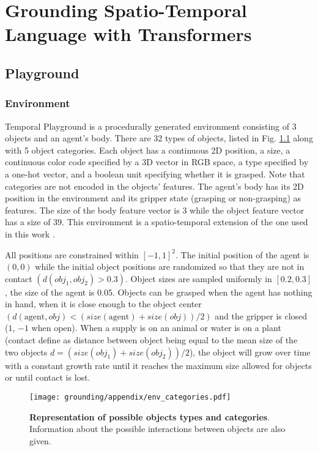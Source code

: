 
\chapter{Grounding Spatio-Temporal Language with Transformers}

\section{Playground}
\subsection{Environment} \label{sup:env}
Temporal Playground is a procedurally generated environment consisting of 3 objects and an agent's body. There are 32 types of objects, listed in Fig. \ref{fig:env-categories} along with 5 object categories. Each object has a continuous 2D position, a size, a continuous color code specified by a 3D vector in RGB space, a type specified by a one-hot vector, and a boolean unit specifying whether it is grasped. Note that categories are not encoded in the objects' features. The agent's body has its 2D position in the environment and its gripper state (grasping or non-grasping) as features. The size of the body feature vector is 3 while the object feature vector has a size of $39$. This environment is a spatio-temporal extension of the one used in this work \cite{imagine}.


All positions are constrained within $[-1,1]^2$. The initial position of the agent is $(0,0)$ while the initial object positions are randomized so that they are not in contact $(d(obj_1,obj_2)>0.3)$. Object sizes are sampled uniformly in $[0.2, 0.3]$, the size of the agent is $0.05$. Objects can be grasped when the agent has nothing in hand, when it is close enough to the object center $(d(\text{agent},obj)<(size(\text{agent}) + size(obj)) / 2)$ and the gripper is closed ($1$, $-1$ when open). When a supply is on an animal or water is on a plant (contact define as distance between object being equal to the mean size of the two objects $d=(size(obj_1)+size(obj_2))/2$), the object will grow over time with a constant growth rate until it reaches the maximum size allowed for objects or until contact is lost.

\begin{figure}[h!]
\centering
\texttt{[image: grounding/appendix/env\_categories.pdf]}
\caption{\textbf{Representation of possible objects types and categories}. Information about the possible interactions between objects are also given.}
\label{fig:env-categories}
\end{figure}

